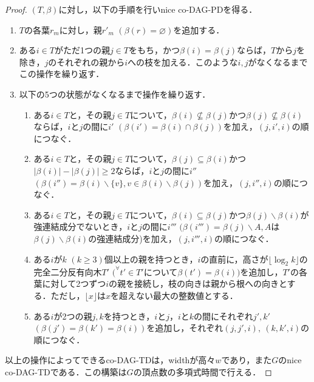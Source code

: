 \documentclass[master]{kuisthesis}		%
\theoremstyle{plain}
\theoremstyle{definition}
\begin{document}
\begin{proof}
    $(T, \beta)$に対し，以下の手順を行いnice co-DAG-PDを得る．

    \begin{enumerate}
        \item $T$の各葉$r_m$に対し，親$r'_m$ $(\beta(r) = \varnothing)$を追加する．
        \item ある$i \in T$がただ1つの親$j \in T$をもち，かつ$\beta(i) = \beta(j)$ならば，$T$から$j$を除き，$j$のそれぞれの親から$i$への枝を加える．このような$i, j$がなくなるまでこの操作を繰り返す．
        \item 以下の5つの状態がなくなるまで操作を繰り返す．
        \begin{enumerate}
            \item ある$i \in T$と，その親$j \in T$について，$\beta(i) \nsubseteq \beta(j)$かつ$\beta(j) \nsubseteq \beta(i)$ならば，$i$と$j$の間に$i'$ $(\beta(i') = \beta(i) \cap \beta(j))$を加え，$(j, i', i)$の順につなぐ．
            \item ある$i \in T$と，その親$j \in T$について，$\beta(j) \subseteq \beta(i)$かつ$|\beta(i)| - |\beta(j)| \geq 2$ならば，$i$と$j$の間に$i''$ $(\beta(i'') = \beta(i) \backslash \{v\}, v \in \beta(i) \backslash \beta(j))$を加え，$(j, i'', i)$の順につなぐ．
            \item ある$i \in T$と，その親$j \in T$について，$\beta(i) \subseteq \beta(j)$かつ$\beta(j) \backslash \beta(i)$が強連結成分でないとき，$i$と$j$の間に$i'''$ $(\beta(i''') = \beta(j) \backslash A, A$は$\beta(j) \backslash \beta(i)$の強連結成分)を加え，$(j, i''', i)$の順につなぐ．
            \item ある$i$が$k$ $(k \geq 3)$個以上の親を持つとき，$i$の直前に，高さが$\lfloor \log_{2} k \rfloor$の完全二分反有向木$T'$ $(^{\forall}t' \in T'$について$\beta(t') = \beta(i))$を追加し，$T'$の各葉に対して2つずつ$i$の親を接続し，枝の向きは親から根への向きとする．ただし，$\lfloor x \rfloor$は$x$を超えない最大の整数値とする．
            \item ある$i$が2つの親$j, k$を持つとき，$i$と$j$，$i$と$k$の間にそれぞれ$j', k'$ $(\beta(j') = \beta(k') = \beta(i))$を追加し，それぞれ$(j, j', i),\ (k, k', i)$の順につなぐ．
        \end{enumerate}
    \end{enumerate}

    以上の操作によってできるco-DAG-TDは，widthが高々$w$であり，また$G$のnice co-DAG-TDである．この構築は$G$の頂点数の多項式時間で行える．
\end{proof}
\end{document}
